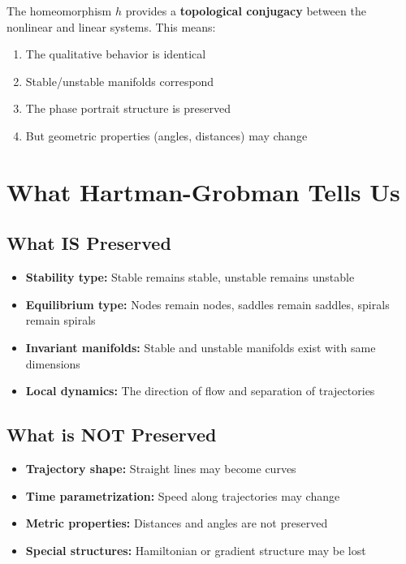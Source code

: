 \documentclass[12pt]{article}
\begin{document}
\begin{insight}
The homeomorphism $h$ provides a \textbf{topological conjugacy} between the nonlinear and linear systems. This means:
\begin{enumerate}
    \item The qualitative behavior is identical
    \item Stable/unstable manifolds correspond
    \item The phase portrait structure is preserved
    \item But geometric properties (angles, distances) may change
\end{enumerate}
\end{insight}

\section{What Hartman-Grobman Tells Us}

\subsection{What IS Preserved}

\begin{itemize}
    \item \textbf{Stability type:} Stable remains stable, unstable remains unstable
    \item \textbf{Equilibrium type:} Nodes remain nodes, saddles remain saddles, spirals remain spirals
    \item \textbf{Invariant manifolds:} Stable and unstable manifolds exist with same dimensions
    \item \textbf{Local dynamics:} The direction of flow and separation of trajectories
\end{itemize}

\subsection{What is NOT Preserved}

\begin{itemize}
    \item \textbf{Trajectory shape:} Straight lines may become curves
    \item \textbf{Time parametrization:} Speed along trajectories may change
    \item \textbf{Metric properties:} Distances and angles are not preserved
    \item \textbf{Special structures:} Hamiltonian or gradient structure may be lost
\end{itemize}
\end{document}
